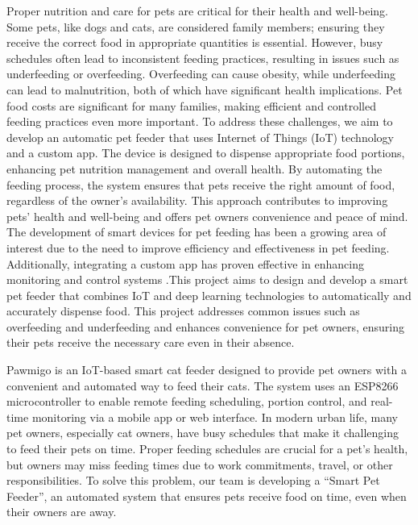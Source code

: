 \documentclass[10pt,a4paper]{extarticle}
\begin{document}
Proper nutrition and care for pets are critical for their health and well-being. Some pets, like dogs and cats, are considered family members; ensuring they receive the correct food in appropriate quantities is essential. However, busy schedules often lead to inconsistent feeding practices, resulting in issues such as underfeeding or overfeeding. Overfeeding can cause obesity, while underfeeding can lead to malnutrition, both of which have significant health implications. Pet food costs are significant for many families, making efficient and controlled feeding practices even more important.
To address these challenges, we aim to develop an automatic pet feeder that uses Internet of Things (IoT) technology and a custom app. The device is designed to dispense appropriate food portions, enhancing pet nutrition management and overall health. By automating the feeding process, the system ensures that pets receive the right amount of food, regardless of the owner's availability. This approach contributes to improving pets' health and well-being and offers pet owners convenience and peace of mind. The development of smart devices for pet feeding has been a growing area of interest due to the need to improve efficiency and effectiveness in pet feeding. Additionally, integrating a custom app has proven effective in enhancing monitoring and control systems .This project aims to design and develop a smart pet feeder that combines IoT and deep learning technologies to automatically and accurately dispense food. This project addresses common issues such as overfeeding and underfeeding and enhances convenience for pet owners, ensuring their pets receive the necessary care even in their absence.

Pawmigo is an IoT-based smart cat feeder designed to provide pet owners with a convenient and automated way to feed their cats. The system uses an ESP8266 microcontroller to enable remote feeding scheduling, portion control, and real-time monitoring via a mobile app or web interface. In modern urban life, many pet owners, especially cat owners, have busy schedules that make it challenging to feed their pets on time. Proper feeding schedules are crucial for a pet's health, but owners may miss feeding times due to work commitments, travel, or other responsibilities. To solve this problem, our team is developing a “Smart Pet Feeder”, an automated system that ensures pets receive food on time, even when their owners are away. 

\vspace{2em}
\end{document}
